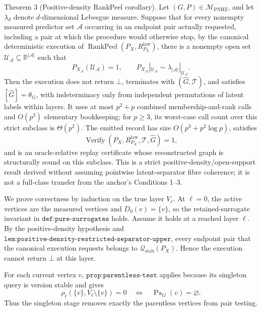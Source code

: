 Theorem 3 (Positive-density RankPeel corollary).  Let \((G,P)\in\mathcal M_{\mathrm{PNHZ}}\), and let \(\lambda_d\) denote \(d\)-dimensional Lebesgue measure.  Suppose that for every nonempty measured predictor set \(\mathcal A\) occurring in an endpoint pair actually requested, including a pair at which the procedure would otherwise stop, by the canonical deterministic execution of \(\operatorname{RankPeel}(P_X,R^{\mathrm{law}}_{P_X})\), there is a nonempty open set \(\mathcal U_{\mathcal A}\subseteq\mathbb R^{|\mathcal A|}\) such that
\[
 P_{X_{\mathcal A}}(\mathcal U_{\mathcal A})=1,
 \qquad
 P_{X_{\mathcal A}}|_{\mathcal U_{\mathcal A}}
 \sim\lambda_{|\mathcal A|}|_{\mathcal U_{\mathcal A}}.
\]
Then the execution does not return \(\bot\), terminates with \((\widehat G,\mathcal T)\), and satisfies \([\widehat G]=\theta_G\), with indeterminacy only from independent permutations of latent labels within layers.  It uses at most \(p^2+p\) combined membership-and-rank calls and \(O(p^3)\) elementary bookkeeping; for \(p\geq3\), its worst-case call count over this strict subclass is \(\Theta(p^2)\).  The emitted record has size \(O(p^3+p^2\log p)\), satisfies
\[
 \operatorname{Verify}(P_X,R^{\mathrm{law}}_{P_X},\mathcal T,\widehat G)=1,
\]
and is an oracle-relative replay certificate whose reconstructed graph is structurally sound on this subclass.  This is a strict positive-density/open-support result derived without assuming pointwise latent-separator fibre coherence; it is not a full-class transfer from the anchor's Conditions 1--3.

We prove correctness by induction on the true layer \(V_\ell\).  At \(\ell=0\), the active vertices are the measured vertices and \(D_0(v)=\{v\}\), so the retained-surrogate invariant in \(\texttt{def:pure-surrogates}\) holds.  Assume it holds at a reached layer \(\ell\).  By the positive-density hypothesis and \(\texttt{lem:positive-density-restricted-separator-upper}\), every endpoint pair that the canonical execution requests belongs to \(\mathcal Q_{\mathrm{stab}}(P_X)\).  Hence the execution cannot return \(\bot\) at this layer.

For each current vertex \(v\), \(\texttt{prop:parentless-test}\) applies because its singleton query is version stable and gives
\[
 \rho_\ell(\{v\},V_\ell\setminus\{v\})=0
 \quad\Longleftrightarrow\quad
 \operatorname{Pa}_G(v)=\varnothing. \tag{1}
\]
Thus the singleton stage removes exactly the parentless vertices from pair testing.

